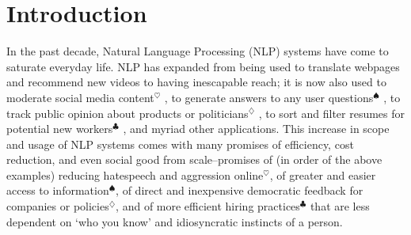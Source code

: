 \chapter{Introduction} \label{chapter:introduction}
In the past decade, Natural Language Processing (NLP) systems have come to saturate everyday life. NLP has expanded from being used to translate webpages and recommend new videos to having inescapable reach; it is now also used to moderate social media content$^{\heartsuit}$ \citep{}, to generate answers to any user questions$^{\spadesuit}$ \citep{}, to track public opinion about products or politicians$^{\diamondsuit}$ \citep{}, to sort and filter resumes for potential new workers$^{\clubsuit}$ \citep{}, and myriad other applications.
This increase in scope and usage of NLP systems comes with many promises of efficiency, cost reduction, and even social good from scale--promises of (in order of the above examples) reducing hatespeech and aggression online$^{\heartsuit}$, of greater and easier access to information$^{\spadesuit}$, of direct and inexpensive democratic feedback for companies or policies$^{\diamondsuit}$, and of more efficient hiring practices$^{\clubsuit}$ that are less dependent on `who you know' and idiosyncratic instincts of a person.

